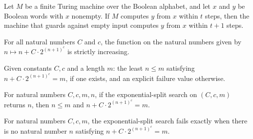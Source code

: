 \begin{lemma}
\label{Complexity.a3_nonempty_computes}
\leanok
{}
Let $M$ be a finite Turing machine over the Boolean alphabet, and let $x$ and $y$ be
Boolean words with $x$ nonempty. If $M$ computes $y$ from $x$ within $t$ steps, then the
machine that guards against empty input computes $y$ from $x$ within $t+1$ steps.
\end{lemma}

\begin{lemma}
\label{Complexity.a3_split_strictMono}
\leanok
{}
For all natural numbers $C$ and $c$, the function on the natural numbers given by
$n\mapsto n+C\cdot 2^{(n+1)^c}$ is strictly increasing.
\end{lemma}

\begin{definition}
\label{Complexity.a3Split}
\leanok
Given constants $C, c$ and a length $m$: the least $n \le m$ satisfying
$n + C \cdot 2^{(n+1)^c} = m$, if one exists, and an explicit failure value
otherwise.
\end{definition}

\begin{lemma}
\label{Complexity.a3_split_spec}
\leanok
{}
For natural numbers $C,c,m,n$, if the exponential-split search on $(C,c,m)$ returns $n$,
then $n\le m$ and $n+C\cdot 2^{(n+1)^c}=m$.
\end{lemma}

\begin{lemma}
\label{Complexity.a3_split_none_iff}
\leanok
{}
For natural numbers $C,c,m$, the exponential-split search fails exactly when there is no
natural number $n$ satisfying $n+C\cdot 2^{(n+1)^c}=m$.
\end{lemma}

